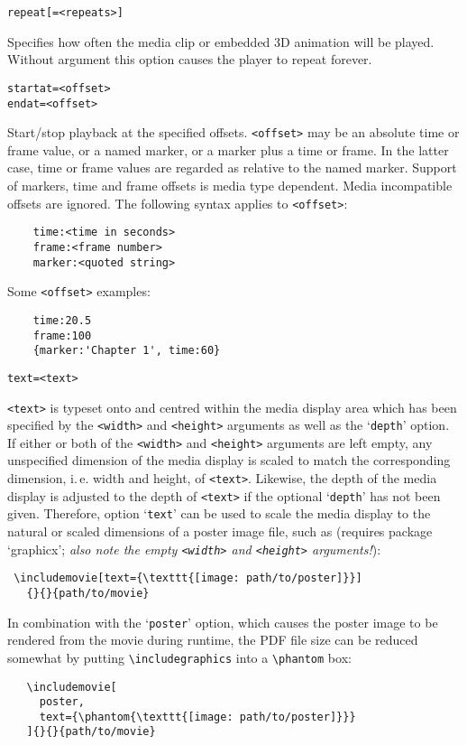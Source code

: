 \documentclass[a4paper]{article}
\begin{document}
\begin{verbatim}
repeat[=<repeats>]
\end{verbatim}
Specifies how often the media clip or embedded 3D animation will be played. Without argument this option causes the player to repeat forever.
\begin{verbatim}
startat=<offset>
endat=<offset>
\end{verbatim}
Start/stop playback at the specified offsets. \verb+<offset>+ may be an absolute time or frame value, or a named marker, or a marker plus a time or frame. In the latter case, time or frame values are regarded as relative to the named marker. Support of markers, time and frame offsets is media type dependent. Media incompatible offsets are ignored. The following syntax applies to \verb+<offset>+:
\begin{verbatim}
    time:<time in seconds>
    frame:<frame number>
    marker:<quoted string>
\end{verbatim}
Some \verb+<offset>+ examples:
\begin{verbatim}
    time:20.5
    frame:100
    {marker:'Chapter 1', time:60}
\end{verbatim}
\hypertarget{lnk:textoption}{}
\begin{verbatim}
text=<text>
\end{verbatim}
\verb+<text>+ is typeset onto and centred within the media display area which has been specified by the \verb+<width>+ and \verb+<height>+ arguments as well as the `\verb+depth+' option. If either or both of the \verb+<width>+ and \verb+<height>+ arguments are left empty, any unspecified dimension of the media display is scaled to match the corresponding dimension, i.\,e. width and height, of \verb+<text>+. Likewise, the depth of the media display is adjusted to the depth of \verb+<text>+ if the optional `\verb+depth+' has not been given. Therefore, option `\verb+text+' can be used to scale the media display to the natural or scaled dimensions of a poster image file, such as (requires package `graphicx'; \emph{also note the empty {\tt<width>} and  {\tt<height>} arguments!}):
\begin{verbatim}
 \includemovie[text={\texttt{[image: path/to/poster]}}]
   {}{}{path/to/movie}
\end{verbatim}
In combination with the `\verb+poster+' option, which causes the poster image to be rendered from the movie during runtime, the PDF file size can be reduced somewhat by putting \verb+\includegraphics+ into a \verb+\phantom+ box:
\begin{verbatim}
   \includemovie[
     poster,
     text={\phantom{\texttt{[image: path/to/poster]}}}
   ]{}{}{path/to/movie}
\end{verbatim}
\end{document}
